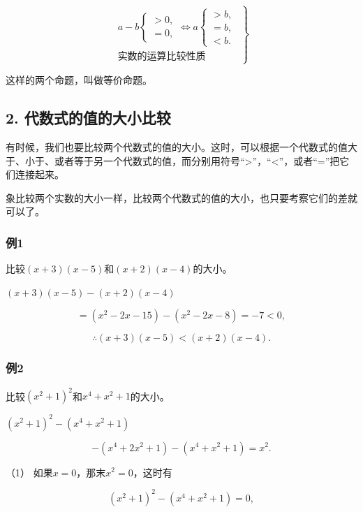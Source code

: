 \[
\left. \begin{array}{c} a - b \left\{ \begin{array}{l} > 0, \\ = 0, \end{array} \right. \Leftrightarrow a \left\{ \begin{array}{l} > b, \\ = b, \\ < b. \end{array} \right. \\ \text{实数的运算比较性质} \end{array} \right\}
\]

这样的两个命题，叫做等价命题。

\subsection{2. 代数式的值的大小比较}

有时候，我们也要比较两个代数式的值的大小。这时，可以根据一个代数式的值大于、小于、或者等于另一个代数式的值，而分别用符号``\textgreater''，``\textless''，或者``=''把它们连接起来。

象比较两个实数的大小一样，比较两个代数式的值的大小，也只要考察它们的差就可以了。

\subsubsection{例1}

比较\((x + 3)(x - 5)\)和\((x + 2)(x - 4)\)的大小。

 \((x + 3)(x - 5) - (x + 2)(x - 4)\)

\[
= (x^{2} - 2 x - 15) - (x^{2} - 2 x - 8) = - 7 < 0,
\]

\[
\therefore (x + 3) (x - 5) < (x + 2) (x - 4).
\]

\subsubsection{例2}

比较\((x^{2} + 1)^{2}\)和\(x^{4} + x^{2} + 1\)的大小。

 \((x^{2} + 1)^{2} - (x^{4} + x^{2} + 1)\)

\[
- (x^{4} + 2 x^{2} + 1) - (x^{4} + x^{2} + 1) = x^{2}.
\]

（1） 如果\(x = 0\)，那末\(x^2 = 0\)，这时有

\[
(x^{2} + 1)^{2} - (x^{4} + x^{2} + 1) = 0,
\]

